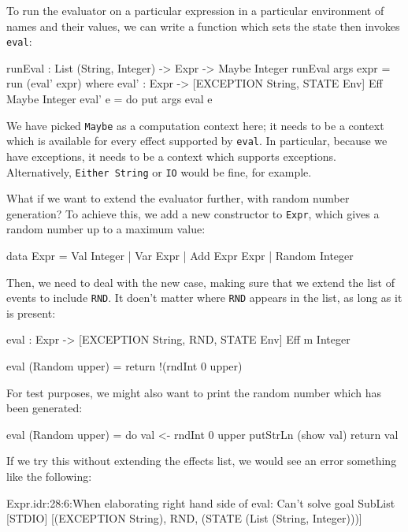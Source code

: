 To run the evaluator on a particular expression in a particular environment
of names and their values, we can write a function which sets the state then
invokes \texttt{eval}:

\begin{code}
runEval : List (String, Integer) -> Expr -> Maybe Integer
runEval args expr = run (eval' expr)
  where eval' : Expr -> { [EXCEPTION String, STATE Env] } Eff Maybe Integer
        eval' e = do put args
                     eval e
\end{code}

We have picked \texttt{Maybe} as a computation context here; it needs to
be a context which is available for every effect supported by \texttt{eval}.
In particular, because we have exceptions, it needs to be a context which
supports exceptions. Alternatively, \texttt{Either String} or \texttt{IO}
would be fine, for example.

What if we want to extend the evaluator further, with random number generation?
To achieve this, we add a new constructor to \texttt{Expr}, which gives
a random number up to a maximum value:

\begin{code}
data Expr = Val Integer
          | Var Expr
          | Add Expr Expr
          | Random Integer
\end{code}

\noindent
Then, we need to deal with the new case, making sure that we extend the
list of events to include \texttt{RND}. It doen't matter where \texttt{RND}
appears in the list, as long as it is present:

\begin{code}
eval : Expr -> { [EXCEPTION String, RND, STATE Env] } Eff m Integer

eval (Random upper) = return !(rndInt 0 upper)
\end{code}

\noindent
For test purposes, we might also want to print the random number which has
been generated:

\begin{code}
eval (Random upper) = do val <- rndInt 0 upper
                         putStrLn (show val)
                         return val
\end{code}

\noindent
If we try this without extending the effects list, we would see an error
something like the following:

\begin{code}
Expr.idr:28:6:When elaborating right hand side of eval:
Can't solve goal 
   SubList [STDIO]
           [(EXCEPTION String), RND, (STATE (List (String, Integer)))]
\end{code}

